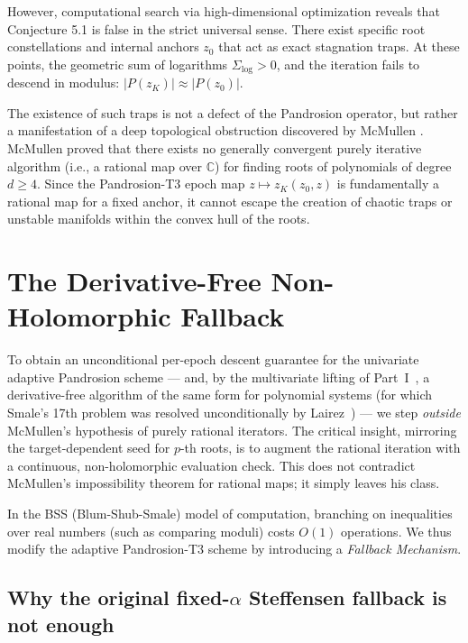\documentclass[11pt,a4paper]{article}
\begin{document}
However, computational search via high-dimensional optimization reveals that Conjecture 5.1 is false in the strict universal sense. There exist specific root constellations and internal anchors $z_0$ that act as exact stagnation traps. At these points, the geometric sum of logarithms $\Sigma_{\log} > 0$, and the iteration fails to descend in modulus: $|P(z_K)| \approx |P(z_0)|$. 

The existence of such traps is not a defect of the Pandrosion operator, but rather a manifestation of a deep topological obstruction discovered by McMullen \cite{mcmullen}. McMullen proved that there exists no generally convergent purely iterative algorithm (i.e., a rational map over $\mathbb{C}$) for finding roots of polynomials of degree $d \ge 4$. Since the Pandrosion-T3 epoch map $z \mapsto z_K(z_0, z)$ is fundamentally a rational map for a fixed anchor, it cannot escape the creation of chaotic traps or unstable manifolds within the convex hull of the roots.

\section{The Derivative-Free Non-Holomorphic Fallback}
To obtain an unconditional per-epoch descent guarantee for the univariate adaptive Pandrosion scheme --- and, by the multivariate lifting of Part~I~\cite[\S 3.5]{besevic1}, a derivative-free algorithm of the same form for polynomial systems (for which Smale's 17th problem was resolved unconditionally by Lairez~\cite{lairez}) --- we step \emph{outside} McMullen's hypothesis of purely rational iterators. The critical insight, mirroring the target-dependent seed for $p$-th roots, is to augment the rational iteration with a continuous, non-holomorphic evaluation check. This does not contradict McMullen's impossibility theorem for rational maps; it simply leaves his class.

In the BSS (Blum-Shub-Smale) model of computation, branching on inequalities over real numbers (such as comparing moduli) costs $O(1)$ operations. We thus modify the adaptive Pandrosion-T3 scheme by introducing a \textit{Fallback Mechanism}.

\subsection{Why the original fixed-$\alpha$ Steffensen fallback is not enough}\label{sec:why-original-fails}
\end{document}
